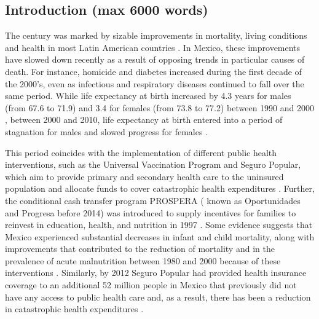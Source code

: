 \documentclass[11.5pt]{article}
\begin{document}
\begin{spacing}{1.5}
\section*{Introduction (max 6000 words)}
The  century was marked by sizable improvements in mortality, living
conditions and health in most Latin American countries \citep{who2000}. 
In Mexico, these improvements have slowed down recently as a result of opposing
trends in particular causes of death. For instance, homicide and diabetes
increased during the first decade of the 2000's, even as infectious and
respiratory diseases continued to fall over the same period. While life
expectancy at birth increased by 4.3 years for males (from 67.6 to 71.9) and 3.4
for females (from 73.8 to 77.2) between 1990 and 2000 \citep{SOMEDE},
between 2000 and 2010, life expectancy at birth entered into a period of
stagnation for males and slowed progress for females \citep{canudas2014}. 


This
period coincides with the implementation of different public health
interventions, such as the Universal Vaccination Program and Seguro
Popular, which aim to provide primary and secondary
health care to the uninsured population and allocate funds to cover catastrophic
health expenditures \citep{knaul2005}. Further, the conditional cash transfer program PROSPERA ( known as Oportunidades and Progresa before 2014)
was introduced to supply incentives for families to reinvest in education, health, and nutrition in 1997 \citep{neufeld2012}. Some evidence
suggests that Mexico experienced substantial decreases in infant and child
mortality, along with improvements that contributed to the reduction of
mortality and in the prevalence of acute malnutrition between 1980 and 2000
because of these interventions \citep{sepulveda2006}. Similarly, by 2012 Seguro Popular had provided health insurance coverage to an additional 52 million
people in Mexico that previously did not have any access to public health care and, as a result, there has been a reduction in catastrophic health expenditures \citep{knaul2012}.


\end{spacing}
\end{document}
